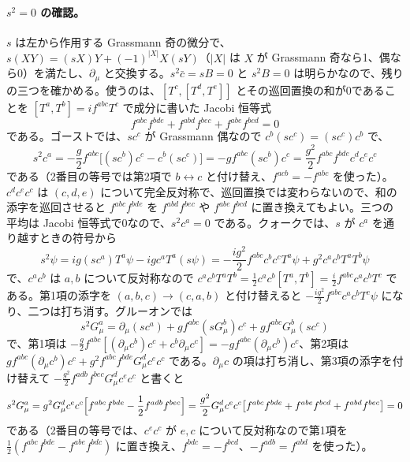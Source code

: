 \documentclass[a4paper,10pt]{ltjsarticle}
\begin{document}
\paragraph{$s^2=0$ の確認。}$s$ は左から作用する Grassmann 奇の微分で、$s(XY)=(sX)Y+(-1)^{|X|}X(sY)$（$|X|$ は $X$ が Grassmann 奇なら1、偶なら0）を満たし、$\partial_\mu$ と交換する。$s^2\bar c=sB=0$ と $s^2B=0$ は明らかなので、残りの三つを確かめる。使うのは、$[T^c,[T^d,T^e]]$ とその巡回置換の和が0であることを $[T^a,T^b]=if^{abc}T^c$ で成分に書いた Jacobi 恒等式
\begin{equation*}
f^{abc}f^{bde}+f^{abd}f^{bec}+f^{abe}f^{bcd}=0
\end{equation*}
である。ゴーストでは、$sc^c$ が Grassmann 偶なので $c^b(sc^c)=(sc^c)c^b$ で、
\begin{equation*}
s^2c^a=-\frac g2f^{abc}\bigl[(sc^b)c^c-c^b(sc^c)\bigr]=-gf^{abc}(sc^b)c^c=\frac{g^2}2f^{abc}f^{bde}c^dc^ec^c
\end{equation*}
である（2番目の等号では第2項で $b\leftrightarrow c$ と付け替え、$f^{acb}=-f^{abc}$ を使った）。$c^dc^ec^c$ は $(c,d,e)$ について完全反対称で、巡回置換では変わらないので、和の添字を巡回させると $f^{abc}f^{bde}$ を $f^{abd}f^{bec}$ や $f^{abe}f^{bcd}$ に置き換えてもよい。三つの平均は Jacobi 恒等式で0なので、$s^2c^a=0$ である。クォークでは、$s$ が $c^a$ を通り越すときの符号から
\begin{equation*}
s^2\psi=ig(sc^a)T^a\psi-igc^aT^a(s\psi)=-\frac{ig^2}2f^{abc}c^bc^cT^a\psi+g^2c^ac^bT^aT^b\psi
\end{equation*}
で、$c^ac^b$ は $a,b$ について反対称なので $c^ac^bT^aT^b=\frac12c^ac^b[T^a,T^b]=\frac i2f^{abc}c^ac^bT^c$ である。第1項の添字を $(a,b,c)\to(c,a,b)$ と付け替えると $-\frac{ig^2}2f^{abc}c^ac^bT^c\psi$ になり、二つは打ち消す。グルーオンでは
\begin{equation*}
s^2G^a_\mu=\partial_\mu(sc^a)+gf^{abc}(sG^b_\mu)c^c+gf^{abc}G^b_\mu(sc^c)
\end{equation*}
で、第1項は $-\frac g2f^{abc}[(\partial_\mu c^b)c^c+c^b\partial_\mu c^c]=-gf^{abc}(\partial_\mu c^b)c^c$、第2項は $gf^{abc}(\partial_\mu c^b)c^c+g^2f^{abc}f^{bde}G^d_\mu c^ec^c$ である。$\partial_\mu c$ の項は打ち消し、第3項の添字を付け替えて $-\frac{g^2}2f^{adb}f^{bec}G^d_\mu c^ec^c$ と書くと
\begin{equation*}
s^2G^a_\mu=g^2G^d_\mu c^ec^c\Bigl[f^{abc}f^{bde}-\frac12f^{adb}f^{bec}\Bigr]=\frac{g^2}2G^d_\mu c^ec^c\bigl[f^{abc}f^{bde}+f^{abe}f^{bcd}+f^{abd}f^{bec}\bigr]=0
\end{equation*}
である（2番目の等号では、$c^ec^c$ が $e,c$ について反対称なので第1項を $\frac12(f^{abc}f^{bde}-f^{abe}f^{bdc})$ に置き換え、$f^{bdc}=-f^{bcd}$、$-f^{adb}=f^{abd}$ を使った）。
\end{document}
